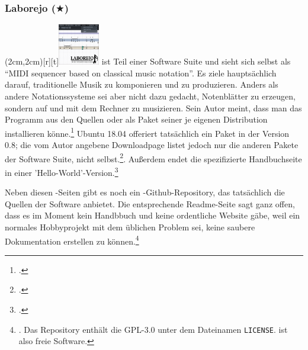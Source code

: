 %
%
%



\subsubsection{Laborejo ($\bigstar$)}

\parpic(2cm,2cm)[r][t]{\includegraphics[width=1.8cm]{logos/laborejo-300dpi.png}}
\label{Laborejo} ist Teil einer Software Suite und sieht sich
selbst als \enquote{MIDI sequencer based on classical music notation}. Es ziele
hauptsächlich darauf, traditionelle Musik zu komponieren und zu produzieren.
Anders als andere Notationssysteme sei  aber nicht dazu gedacht,
Notenblätter zu erzeugen, sondern auf und mit dem Rechner zu musizieren. Sein
Autor meint, dass man das Programm aus den Quellen oder als Paket seiner je
eigenen Distribution installieren könne.\footcite[vgl.][\nopage
wp]{Hilbricht2019a} Ubuntu 18.04 offeriert tatsächlich ein Paket 
in der Version 0.8; die vom Autor angebene Downloadpage listet jedoch nur die
anderen Pakete der Software Suite, nicht 
selbst.\footcite[vgl.][\nopage wp]{Hilbricht2019b}. Außerdem endet die
spezifizierte Handbuchseite in einer
'Hello-World'-Version.\footcite[vgl.][\nopage wp]{Hilbricht2019c}

Neben diesen -Seiten gibt es noch ein
-Github-Repository, das tatsächlich die Quellen der Software
anbietet. Die entsprechende Readme-Seite sagt ganz offen, dass es im Moment kein
Handbbuch und keine ordentliche Website gäbe, weil  ein normales
Hobbyprojekt mit dem üblichen Problem sei, keine saubere Dokumentation erstellen
zu können.\footnote{\cite[vgl.][\nopage wp]{Laborejo2018a}. Das Repository
enthält die GPL-3.0 unter dem Dateinamen \texttt{LICENSE}.  ist
also freie Software.}

